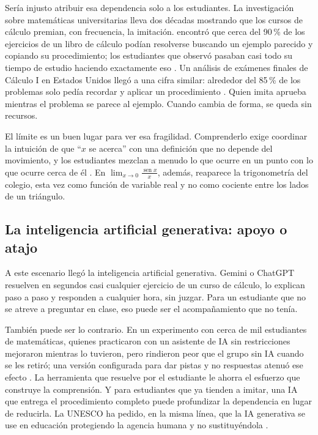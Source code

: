 Sería injusto atribuir esa dependencia solo a los estudiantes. La investigación sobre matemáticas universitarias lleva dos décadas mostrando que los cursos de cálculo premian, con frecuencia, la imitación. \textcite{lithner2004reasoning} encontró que cerca del 90\,\% de los ejercicios de un libro de cálculo podían resolverse buscando un ejemplo parecido y copiando su procedimiento; los estudiantes que observó pasaban casi todo su tiempo de estudio haciendo exactamente eso \parencite{lithner2003students}. Un análisis de exámenes finales de Cálculo I en Estados Unidos llegó a una cifra similar: alrededor del 85\,\% de los problemas solo pedía recordar y aplicar un procedimiento \parencite[reportado en][]{biza2016tertiary}. Quien imita aprueba mientras el problema se parece al ejemplo. Cuando cambia de forma, se queda sin recursos.

El límite es un buen lugar para ver esa fragilidad. Comprenderlo exige coordinar la intuición de que ``$x$ se acerca'' con una definición que no depende del movimiento, y los estudiantes mezclan a menudo lo que ocurre en un punto con lo que ocurre cerca de él \parencite{job2014empirical,vandebrouck2021task,guarin2023limite}. En $\lim_{x\to 0}\frac{\operatorname{sen} x}{x}$, además, reaparece la trigonometría del colegio, esta vez como función de variable real y no como cociente entre los lados de un triángulo.

\subsection*{La inteligencia artificial generativa: apoyo o atajo}

A este escenario llegó la inteligencia artificial generativa. Gemini o ChatGPT resuelven en segundos casi cualquier ejercicio de un curso de cálculo, lo explican paso a paso y responden a cualquier hora, sin juzgar. Para un estudiante que no se atreve a preguntar en clase, eso puede ser el acompañamiento que no tenía.

También puede ser lo contrario. En un experimento con cerca de mil estudiantes de matemáticas, quienes practicaron con un asistente de IA sin restricciones mejoraron mientras lo tuvieron, pero rindieron peor que el grupo sin IA cuando se les retiró; una versión configurada para dar pistas y no respuestas atenuó ese efecto \parencite{bastani2025guardrails}. La herramienta que resuelve por el estudiante le ahorra el esfuerzo que construye la comprensión. Y para estudiantes que ya tienden a imitar, una IA que entrega el procedimiento completo puede profundizar la dependencia en lugar de reducirla. La UNESCO ha pedido, en la misma línea, que la IA generativa se use en educación protegiendo la agencia humana y no sustituyéndola \parencite{unesco2023guia}.

